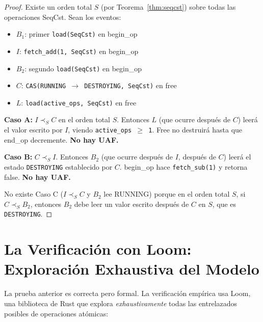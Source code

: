 \begin{proof}
Existe un orden total $S$ (por Teorema~\ref{thm:seqcst}) sobre todas las operaciones
SeqCst. Sean los eventos:
\begin{itemize}
\item $B_1$: primer \texttt{load(SeqCst)} en begin\_op
\item $I$: \texttt{fetch\_add(1, SeqCst)} en begin\_op
\item $B_2$: segundo \texttt{load(SeqCst)} en begin\_op
\item $C$: \texttt{CAS(RUNNING $\to$ DESTROYING, SeqCst)} en free
\item $L$: \texttt{load(active\_ops, SeqCst)} en free
\end{itemize}

\textbf{Caso A:} $I \prec_S C$ en el orden total $S$.
Entonces $L$ (que ocurre después de $C$) leerá el valor escrito por $I$,
viendo \texttt{active\_ops $\ge$ 1}. Free no destruirá hasta que end\_op decremente.
\textbf{No hay UAF.}

\textbf{Caso B:} $C \prec_S I$.
Entonces $B_2$ (que ocurre después de $I$, después de $C$) leerá el estado
\texttt{DESTROYING} establecido por $C$. begin\_op hace \texttt{fetch\_sub(1)} y retorna false.
\textbf{No hay UAF.}

No existe Caso C ($I \prec_S C$ y $B_2$ lee RUNNING) porque en el orden total $S$,
si $C \prec_S B_2$, entonces $B_2$ debe leer un valor escrito después de $C$ en $S$,
que es \texttt{DESTROYING}.
\end{proof}

\section{La Verificación con Loom: Exploración Exhaustiva del Modelo}

La prueba anterior es correcta pero formal. La verificación empírica usa Loom,
una biblioteca de Rust que explora \textit{exhaustivamente} todas las
entrelazados posibles de operaciones atómicas:


